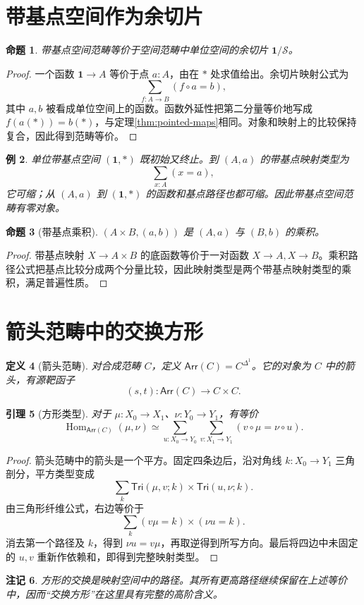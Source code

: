 \documentclass[12pt,oneside,openany,fontset=none]{ctexbook}
\theoremstyle{cn}
\newtheorem{definition}{定义}[chapter]
\newtheorem{example}[definition]{例}
\newtheorem{lemma}[definition]{引理}
\newtheorem{proposition}[definition]{命题}
\newtheorem{remark}[definition]{注记}
\numberwithin{equation}{chapter}
\newcommand{\Sp}{\mathcal S}
\newcommand{\Hom}{\operatorname{Hom}}
\newcommand{\one}{\mathbf 1}
\begin{document}
\section{带基点空间作为余切片}
\begin{proposition}
带基点空间范畴等价于空间范畴中单位空间的余切片 $\one/\Sp$。
\end{proposition}
\begin{proof}
一个函数 $\one\to A$ 等价于点 $a:A$，由在 $*$ 处求值给出。余切片映射公式为
\[
\sum_{f:A\to B}(f\circ a=b),
\]
其中 $a,b$ 被看成单位空间上的函数。函数外延性把第二分量等价地写成 $f(a(*))=b(*)$，与定理\ref{thm:pointed-maps}相同。对象和映射上的比较保持复合，因此得到范畴等价。
\end{proof}
\begin{example}
单位带基点空间 $(\one,*)$ 既初始又终止。到 $(A,a)$ 的带基点映射类型为
\[
\sum_{x:A}(x=a),
\]
它可缩；从 $(A,a)$ 到 $(\one,*)$ 的函数和基点路径也都可缩。因此带基点空间范畴有零对象。
\end{example}
\begin{proposition}[带基点乘积]
$(A\times B,(a,b))$ 是 $(A,a)$ 与 $(B,b)$ 的乘积。
\end{proposition}
\begin{proof}
带基点映射 $X\to A\times B$ 的底函数等价于一对函数 $X\to A,X\to B$。乘积路径公式把基点比较分成两个分量比较，因此映射类型是两个带基点映射类型的乘积，满足普遍性质。
\end{proof}

\section{箭头范畴中的交换方形}
\begin{definition}[箭头范畴]
对合成范畴 $C$，定义 $\mathsf{Arr}(C)=C^{\Delta^1}$。它的对象为 $C$ 中的箭头，有源靶函子
\[
(s,t):\mathsf{Arr}(C)\to C\times C.
\]
\end{definition}
\begin{lemma}[方形类型]\label{lem:arrow-square}
对于 $\mu:X_0\to X_1$、$\nu:Y_0\to Y_1$，有等价
\[
\Hom_{\mathsf{Arr}(C)}(\mu,\nu)
\simeq
\sum_{u:X_0\to Y_0}\sum_{v:X_1\to Y_1}
(v\circ\mu=\nu\circ u).
\]
\end{lemma}
\begin{proof}
箭头范畴中的箭头是一个平方。固定四条边后，沿对角线 $k:X_0\to Y_1$ 三角剖分，平方类型变成
\[
\sum_k\mathsf{Tri}(\mu,v;k)\times\mathsf{Tri}(u,\nu;k).
\]
由三角形纤维公式，右边等价于
\[
\sum_k(v\mu=k)\times(\nu u=k).
\]
消去第一个路径及 $k$，得到 $\nu u=v\mu$，再取逆得到所写方向。最后将四边中未固定的 $u,v$ 重新作依赖和，即得到完整映射类型。
\end{proof}
\begin{remark}
方形的交换是映射空间中的路径。其所有更高路径继续保留在上述等价中，因而“交换方形”在这里具有完整的高阶含义。
\end{remark}
\end{document}

